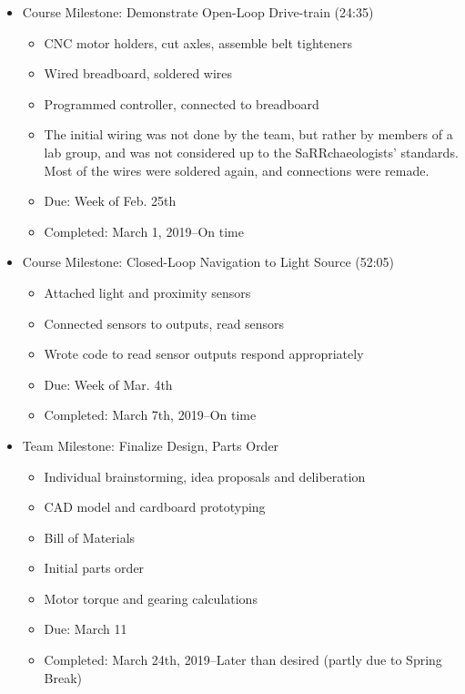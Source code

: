 \begin{itemize} 
\item Course Milestone: Demonstrate Open-Loop Drive-train (24:35)
\begin{itemize}
\item CNC motor holders, cut axles, assemble belt tighteners
\item Wired breadboard, soldered wires
\item Programmed controller, connected to breadboard
\item The initial wiring was not done by the team, but rather by members of a lab group, and was not considered up to the SaRRchaeologists' standards. Most of the wires were soldered again, and connections were remade.
\item Due: Week of Feb. 25th
\item Completed: March 1, 2019--On time
\end{itemize}
\end{itemize}
\begin{itemize}
\item Course Milestone: Closed-Loop Navigation to Light Source (52:05) 
\begin{itemize}
\item Attached light and proximity sensors 
\item Connected sensors to outputs, read sensors 
\item Wrote code to read sensor outputs respond appropriately
\item Due: Week of Mar. 4th
\item Completed: March 7th, 2019--On time
\end{itemize}
\end{itemize}
\begin{itemize}
\item Team Milestone: Finalize Design, Parts Order
\begin{itemize}
\item Individual brainstorming, idea proposals and deliberation
\item CAD model and cardboard prototyping
\item Bill of Materials
\item Initial parts order
\item Motor torque and gearing calculations
\item Due: March 11
\item Completed: March 24th, 2019--Later than desired (partly due to Spring Break)
\end{itemize}
\end{itemize}
